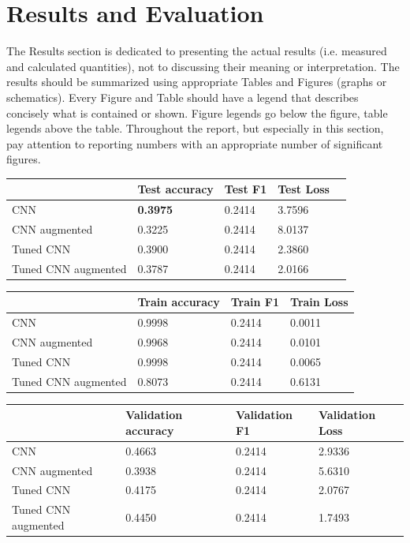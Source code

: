 \section{Results and Evaluation}
The Results section is dedicated to presenting the actual results (i.e. measured and calculated quantities), not to discussing their meaning or interpretation.
The results should be summarized using appropriate Tables and Figures (graphs or schematics).
Every Figure and Table should have a legend that describes concisely what is contained or shown.
Figure legends go below the figure, table legends above the table.
Throughout the report, but especially in this section, pay attention to reporting numbers with an appropriate number of significant figures.

\begin{table}[ht]
\begin{tabular}{|l|l|l|l|l|}
\hline
                    & Test accuracy   & Test F1 & Test Loss \\ \hline
CNN                 & \textbf{0.3975} & 0.2414  & 3.7596    \\ \hline
CNN augmented       & 0.3225          & 0.2414  & 8.0137    \\ \hline
Tuned CNN           & 0.3900          & 0.2414  & 2.3860    \\ \hline
Tuned CNN augmented & 0.3787          & 0.2414  & 2.0166    \\ \hline
\end{tabular}
\end{table}

\begin{table}[ht]
\begin{tabular}{|l|l|l|l|}
\hline
                    & Train accuracy & Train F1 & Train Loss \\ \hline
CNN                 & 0.9998         & 0.2414   & 0.0011     \\ \hline
CNN augmented       & 0.9968         & 0.2414   & 0.0101     \\ \hline
Tuned CNN           & 0.9998         & 0.2414   & 0.0065     \\ \hline
Tuned CNN augmented & 0.8073         & 0.2414   & 0.6131     \\ \hline
\end{tabular}
\end{table}

\begin{table}[ht]
\begin{tabular}{|l|l|l|l|}
\hline
                    & Validation accuracy & Validation F1 & Validation Loss \\ \hline
CNN                 & 0.4663              & 0.2414        & 2.9336          \\ \hline
CNN augmented       & 0.3938              & 0.2414        & 5.6310          \\ \hline
Tuned CNN           & 0.4175              & 0.2414        & 2.0767          \\ \hline
Tuned CNN augmented & 0.4450              & 0.2414        & 1.7493          \\ \hline
\end{tabular}
\end{table}


